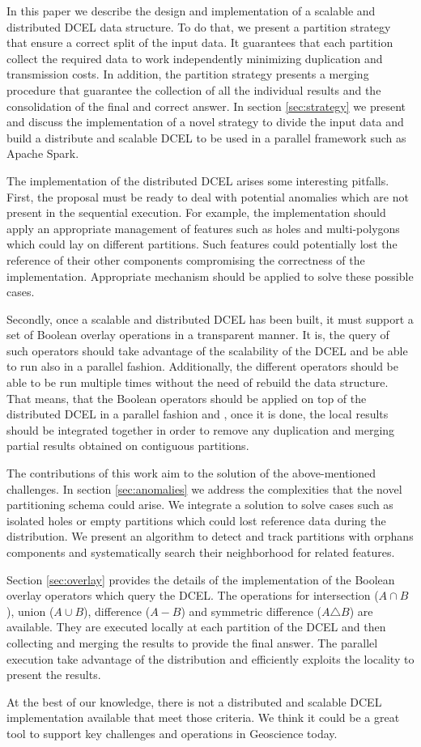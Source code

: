 In this paper we describe the design and implementation of a scalable and distributed DCEL data structure.  To do that, we present a partition strategy that ensure a correct split of the input data.  It guarantees that each partition collect the required data to work independently minimizing duplication and transmission costs.  In addition, the partition strategy presents a merging procedure that guarantee the collection of all the individual results and the consolidation of the final and correct answer.  In section \ref{sec:strategy} we present and discuss the implementation of a novel strategy to divide the input data and build a distribute and scalable DCEL to be used in a parallel framework such as Apache Spark. 

The implementation of the distributed DCEL arises some interesting pitfalls.  First, the proposal must be ready to deal with potential anomalies which are not present in the sequential execution.  For example, the implementation should apply an appropriate management of features such as holes and multi-polygons which could lay on different partitions.  Such features could potentially lost the reference of their other components compromising the correctness of the implementation.  Appropriate mechanism should be applied to solve these possible cases.

Secondly, once a scalable and distributed DCEL has been built, it must support a set of Boolean overlay operations in a transparent manner.  It is, the query of such operators should take advantage of the scalability of the DCEL and be able to run also in a parallel fashion.  Additionally, the different operators should be able to be run multiple times without the need of rebuild the data structure.  That means, that the Boolean operators should be applied on top of the distributed DCEL in a parallel fashion and , once it is done, the local results should be integrated together in order to remove any duplication and merging partial results obtained on contiguous partitions.

The contributions of this work aim to the solution of the above-mentioned challenges.  In section \ref{sec:anomalies} we address the complexities that the novel partitioning schema could arise.  We integrate a solution to solve cases such as isolated holes or empty partitions which could lost reference data during the distribution. We present an algorithm to detect and track partitions with orphans components and systematically search their neighborhood for related features.  

Section \ref{sec:overlay} provides the details of the implementation of the Boolean overlay operators which query the DCEL.  The operations for intersection ($A \cap B$), union ($A \cup B$),  difference ($A - B$) and symmetric difference ($A \triangle B$) are available.  They are executed locally at each partition of the DCEL and then collecting and merging the results to provide the final answer.  The parallel execution take advantage of the distribution and efficiently exploits the locality to present the results.

At the best of our knowledge, there is not a distributed and scalable DCEL implementation available that meet those criteria.  We think it could be a great tool to support key challenges and operations in Geoscience today.
